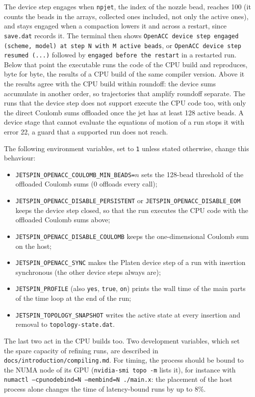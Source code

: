 The device step engages when \texttt{npjet}, the index of the nozzle bead,
reaches 100 (it counts the beads in the arrays, collected ones included,
not only the active ones), and stays engaged when a compaction lowers it
and across a restart, since \texttt{save.dat} records it. The terminal then
shows \texttt{OpenACC device step engaged (scheme, model) at step N with M
active beads}, or \texttt{OpenACC device step resumed (...)} followed by
\texttt{engaged before the restart} in a restarted run. Below that point
the executable runs the code of the CPU build and reproduces, byte for byte,
the results of a CPU build of the same compiler version. Above it the
results agree with the CPU build within roundoff: the device sums
accumulate in another order, so trajectories that amplify roundoff
separate. The runs that the device step does not support execute the CPU
code too, with only the direct Coulomb sums offloaded once the jet has at
least 128 active beads. A device stage that cannot evaluate the equations
of motion of a run stops it with error 22, a guard that a supported run
does not reach.

The following environment variables, set to \texttt{1} unless stated
otherwise, change this behaviour:
\begin{itemize}
\item \texttt{JETSPIN\_OPENACC\_COULOMB\_MIN\_BEADS=}$n$ sets the 128-bead
threshold of the offloaded Coulomb sums ($0$ offloads every call);
\item \texttt{JETSPIN\_OPENACC\_DISABLE\_PERSISTENT} or
\texttt{JETSPIN\_OPENACC\_DISABLE\_EOM} keeps the device step closed, so
that the run executes the CPU code with the offloaded Coulomb sums above;
\item \texttt{JETSPIN\_OPENACC\_DISABLE\_COULOMB} keeps the one-dimensional
Coulomb sum on the host;
\item \texttt{JETSPIN\_OPENACC\_SYNC} makes the Platen device step of a run
with insertion synchronous (the other device steps always are);
\item \texttt{JETSPIN\_PROFILE} (also \texttt{yes}, \texttt{true},
\texttt{on}) prints the wall time of the main parts of the time loop at the
end of the run;
\item \texttt{JETSPIN\_TOPOLOGY\_SNAPSHOT} writes the active state at
every insertion and removal to \texttt{topology-state.dat}.
\end{itemize}
The last two act in the CPU builds too. Two development variables, which
set the spare capacity of refining runs, are described in
\texttt{docs/introduction/compiling.md}.
For timing, the process should be bound to the NUMA node of its GPU
(\texttt{nvidia-smi topo -m} lists it), for instance with
\texttt{numactl --cpunodebind=N --membind=N ./main.x}: the placement of
the host process alone changes the time of latency-bound runs by up to
8\%.

